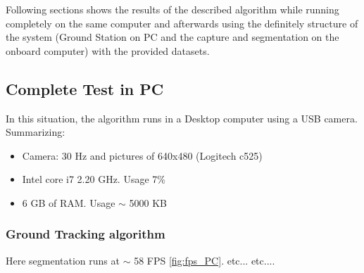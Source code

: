 	Following sections shows the results of the described algorithm while running completely on the same computer and afterwards using the definitely structure of the system (Ground Station on PC and the capture and segmentation on the onboard computer) with the provided datasets.

\subsection{Complete Test in PC}
	In this situation, the algorithm runs in a Desktop computer using a USB camera. Summarizing:
	
	\begin{itemize}
		\item{Camera: 30 Hz and pictures of 640x480 (Logitech c525)}
		\item{Intel core i7 2.20 GHz. Usage 7\%}
		\item{6 GB of RAM. Usage $\sim$ 5000 KB}
	\end{itemize}
		
	\subsubsection{Ground Tracking algorithm}
	
	Here segmentation runs at $\sim$ 58 FPS  \ref{fig:fps_PC}. etc... etc....
	
